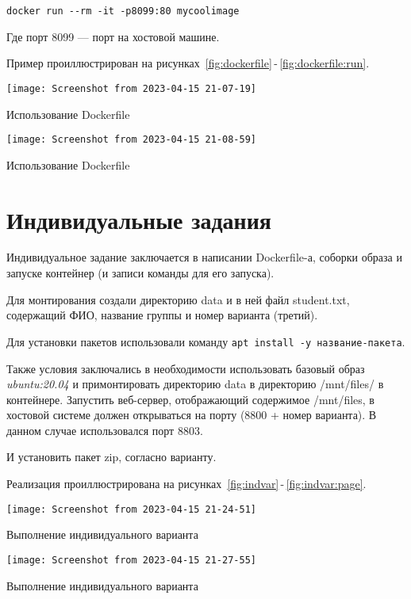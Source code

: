 \begin{verbatim}
docker run --rm -it -p8099:80 mycoolimage
\end{verbatim}

Где порт 8099 --- порт
на хостовой машине.\par
Пример проиллюстрирован
на рисунках~\ref{fig:dockerfile}\,-\,\ref{fig:dockerfile:run}.

\begin{image}
	\texttt{[image: Screenshot from 2023-04-15 21-07-19]}
	\caption{Использование Dockerfile}
	\label{fig:dockerfile}
\end{image}

\begin{image}
	\texttt{[image: Screenshot from 2023-04-15 21-08-59]}
	\caption{Использование Dockerfile}
	\label{fig:dockerfile:run}
\end{image}

\section{Индивидуальные задания}
Индивидуальное задание заключается в написании Dockerfile-а,
соборки образа и запуске контейнер
(и записи команды для его запуска).\par
Для монтирования создали директорию data и в ней файл student.txt,
содержащий ФИО, название группы и номер варианта (третий).\par
Для установки пакетов использовали команду
\texttt{apt install -y название-пакета}.\par
Также условия заключались в необходимости использовать
базовый образ \textit{ubuntu:20.04}
и примонтировать директорию data в директорию /mnt/files/ в контейнере.
Запустить веб-сервер, отображающий содержимое /mnt/files, в хостовой
системе должен открываться на порту (8800 + номер варианта).
В данном случае использовался порт 8803.\par
И установить пакет zip, согласно варианту.\par
Реализация проиллюстрирована
на рисунках~\ref{fig:indvar}\,-\,\ref{fig:indvar:page}.

\begin{image}
	\texttt{[image: Screenshot from 2023-04-15 21-24-51]}
	\caption{Выполнение индивидуального варианта}
	\label{fig:indvar}
\end{image}

\begin{image}
	\texttt{[image: Screenshot from 2023-04-15 21-27-55]}
	\caption{Выполнение индивидуального варианта}
	\label{fig:indvar:run}
\end{image}

